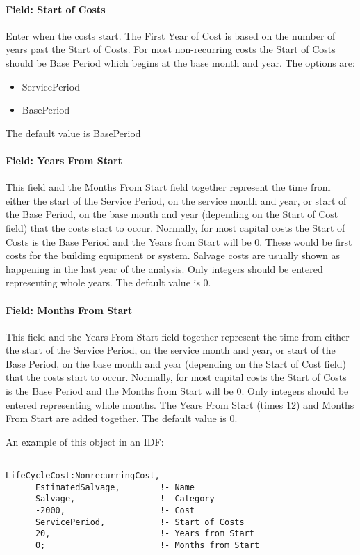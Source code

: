 \paragraph{Field: Start of Costs}\label{field-start-of-costs}

Enter when the costs start. The First Year of Cost is based on the number of years past the Start of Costs. For most non-recurring costs the Start of Costs should be Base Period which begins at the base month and year. The options are:

\begin{itemize}
\item
  ServicePeriod
\item
  BasePeriod
\end{itemize}

The default value is BasePeriod

\paragraph{Field: Years From Start}\label{field-years-from-start}

This field and the Months From Start field together represent the time from either the start of the Service Period, on the service month and year, or start of the Base Period, on the base month and year (depending on the Start of Cost field) that the costs start to occur. Normally, for most capital costs the Start of Costs is the Base Period and the Years from Start will be 0. These would be first costs for the building equipment or system. Salvage costs are usually shown as happening in the last year of the analysis. Only integers should be entered representing whole years. The default value is 0.

\paragraph{Field: Months From Start}\label{field-months-from-start}

This field and the Years From Start field together represent the time from either the start of the Service Period, on the service month and year, or start of the Base Period, on the base month and year (depending on the Start of Cost field) that the costs start to occur. Normally, for most capital costs the Start of Costs is the Base Period and the Months from Start will be 0. Only integers should be entered representing whole months. The Years From Start (times 12) and Months From Start are added together. The default value is 0.

An example of this object in an IDF:

\begin{lstlisting}

LifeCycleCost:NonrecurringCost,
      EstimatedSalvage,        !- Name
      Salvage,                 !- Category
      -2000,                   !- Cost
      ServicePeriod,           !- Start of Costs
      20,                      !- Years from Start
      0;                       !- Months from Start
\end{lstlisting}